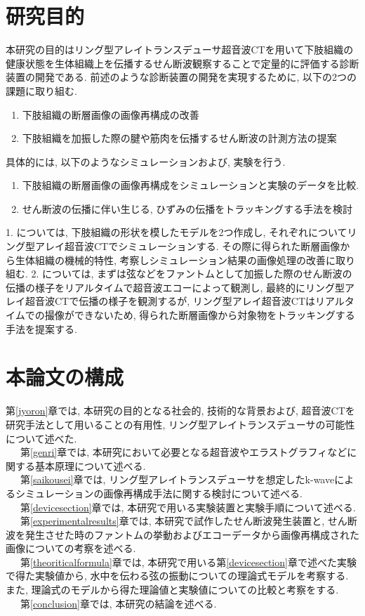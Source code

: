 \section{研究目的}
本研究の目的はリング型アレイトランスデューサ超音波CTを用いて下肢組織の健康状態を生体組織上を伝播するせん断波観察することで定量的に評価する診断装置の開発である. 前述のような診断装置の開発を実現するために, 以下の2つの課題に取り組む. 
\begin{enumerate}
   \item 下肢組織の断層画像の画像再構成の改善
   \item 下肢組織を加振した際の腱や筋肉を伝播するせん断波の計測方法の提案
\end{enumerate}
具体的には, 以下のようなシミュレーションおよび, 実験を行う.
\begin{enumerate}
   \item 下肢組織の断層画像の画像再構成をシミュレーションと実験のデータを比較.
   \item せん断波の伝播に伴い生じる, ひずみの伝播をトラッキングする手法を検討
\end{enumerate}
1. については, 下肢組織の形状を模したモデルを2つ作成し, それぞれについてリング型アレイ超音波CTでシミュレーションする. その際に得られた断層画像から生体組織の機械的特性, 考察しシミュレーション結果の画像処理の改善に取り組む. 2. については, まずは弦などをファントムとして加振した際のせん断波の伝播の様子をリアルタイムで超音波エコーによって観測し, 最終的にリング型アレイ超音波CTで伝播の様子を観測するが, リング型アレイ超音波CTはリアルタイムでの撮像ができないため, 得られた断層画像から対象物をトラッキングする手法を提案する. 

\section{本論文の構成}
第\ref{jyoron}章では, 本研究の目的となる社会的, 技術的な背景および, 超音波CTを研究手法として用いることの有用性, リング型アレイトランスデューサの可能性について述べた.
\\\ \ \ 第\ref{genri}章では, 本研究において必要となる超音波やエラストグラフィなどに関する基本原理について述べる.
\\\ \ \ 第\ref{saikousei}章では, リング型アレイトランスデューサを想定したk-waveによるシミュレーションの画像再構成手法に関する検討について述べる.
\\\ \ \ 第\ref{devicesection}章では, 本研究で用いる実験装置と実験手順について述べる. 
\\\ \ \ 第\ref{experimentalresults}章では, 本研究で試作したせん断波発生装置と, せん断波を発生させた時のファントムの挙動およびエコーデータから画像再構成された画像についての考察を述べる.
\\\ \ \ 第\ref{theoriticalformula}章では, 本研究で用いる第\ref{devicesection}章で述べた実験で得た実験値から, 水中を伝わる弦の振動についての理論式モデルを考察する. また, 理論式のモデルから得た理論値と実験値についての比較と考察をする. 
\\\ \ \ 第\ref{conclusion}章では, 本研究の結論を述べる. 




